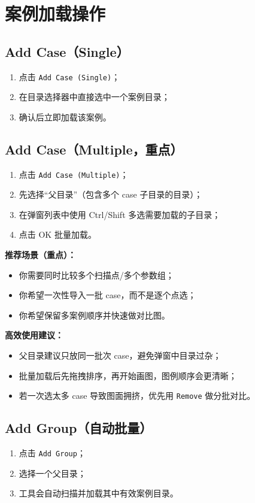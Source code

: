 \documentclass[11pt,a4paper]{ctexart}
\begin{document}
\section{案例加载操作}
\subsection{Add Case（Single）}
\begin{enumerate}
  \item 点击 \texttt{Add Case (Single)}；
  \item 在目录选择器中直接选中一个案例目录；
  \item 确认后立即加载该案例。
\end{enumerate}

\subsection{Add Case（Multiple，重点）}
\begin{enumerate}
  \item 点击 \texttt{Add Case (Multiple)}；
  \item 先选择“父目录”（包含多个 case 子目录的目录）；
  \item 在弹窗列表中使用 Ctrl/Shift 多选需要加载的子目录；
  \item 点击 OK 批量加载。
\end{enumerate}

\noindent\textbf{推荐场景（重点）：}
\begin{itemize}
  \item 你需要同时比较多个扫描点/多个参数组；
  \item 你希望一次性导入一批 case，而不是逐个点选；
  \item 你希望保留多案例顺序并快速做对比图。
\end{itemize}
\noindent\textbf{高效使用建议：}
\begin{itemize}
  \item 父目录建议只放同一批次 case，避免弹窗中目录过杂；
  \item 批量加载后先拖拽排序，再开始画图，图例顺序会更清晰；
  \item 若一次选太多 case 导致图面拥挤，优先用 \texttt{Remove} 做分批对比。
\end{itemize}

\subsection{Add Group（自动批量）}
\begin{enumerate}
  \item 点击 \texttt{Add Group}；
  \item 选择一个父目录；
  \item 工具会自动扫描并加载其中有效案例目录。
\end{enumerate}
\end{document}
